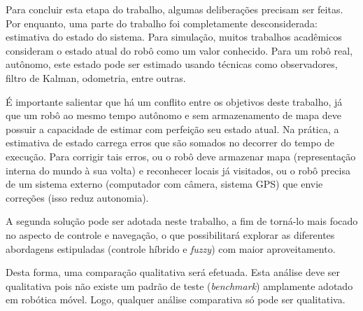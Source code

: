 Para concluir esta etapa do trabalho, algumas deliberações precisam ser feitas.
Por enquanto, uma parte do trabalho foi completamente desconsiderada: estimativa
do estado do sistema. Para simulação, muitos trabalhos acadêmicos consideram o
estado atual do robô como um valor conhecido. Para um robô real, autônomo, este
estado pode ser estimado usando técnicas como observadores, filtro de Kalman,
odometria, entre outras.

É importante salientar que há um conflito entre os objetivos deste trabalho,
já que um robô ao mesmo tempo autônomo e sem armazenamento de mapa deve possuir
a capacidade de estimar com perfeição seu estado atual. Na prática, a estimativa
de estado carrega erros que são somados no decorrer do tempo de execução. Para
corrigir tais erros, ou o robô deve armazenar mapa (representação interna do
mundo à sua volta) e reconhecer locais já visitados, ou o robô precisa de um
sistema externo (computador com câmera, sistema GPS) que envie correções
(isso reduz autonomia). 

A segunda solução pode ser adotada neste trabalho, a fim de torná-lo mais focado
no aspecto de controle e navegação, o que possibilitará explorar as diferentes
abordagens estipuladas (controle híbrido e \textit{fuzzy}) com maior
aproveitamento. 

Desta forma, uma comparação qualitativa será efetuada. Esta análise
deve ser qualitativa pois não existe um padrão de teste (\textit{benchmark})
amplamente adotado em robótica móvel. Logo, qualquer análise comparativa só pode
ser qualitativa.








